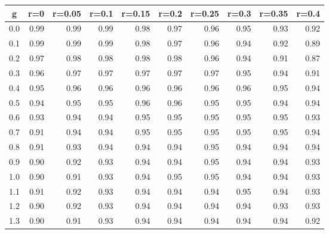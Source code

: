 %
\begin{table}[!tbp]
 \begin{center}
 \begin{tabular}{rrrrrrrrrr}\hline\hline
\multicolumn{1}{c}{g}&\multicolumn{1}{c}{r=0}&\multicolumn{1}{c}{r=0.05}&\multicolumn{1}{c}{r=0.1}&\multicolumn{1}{c}{r=0.15}&\multicolumn{1}{c}{r=0.2}&\multicolumn{1}{c}{r=0.25}&\multicolumn{1}{c}{r=0.3}&\multicolumn{1}{c}{r=0.35}&\multicolumn{1}{c}{r=0.4}\tabularnewline
\hline
0.0&0.99&0.99&0.99&0.98&0.97&0.96&0.95&0.93&0.92\tabularnewline
0.1&0.99&0.99&0.99&0.98&0.97&0.96&0.94&0.92&0.89\tabularnewline
0.2&0.97&0.98&0.98&0.98&0.98&0.96&0.94&0.91&0.87\tabularnewline
0.3&0.96&0.97&0.97&0.97&0.97&0.97&0.95&0.94&0.91\tabularnewline
0.4&0.95&0.96&0.96&0.96&0.96&0.96&0.96&0.95&0.94\tabularnewline
0.5&0.94&0.95&0.95&0.96&0.96&0.95&0.95&0.94&0.94\tabularnewline
0.6&0.93&0.94&0.94&0.95&0.95&0.95&0.95&0.95&0.93\tabularnewline
0.7&0.91&0.94&0.94&0.95&0.95&0.95&0.95&0.95&0.94\tabularnewline
0.8&0.91&0.93&0.94&0.94&0.94&0.95&0.94&0.94&0.94\tabularnewline
0.9&0.90&0.92&0.93&0.94&0.94&0.95&0.94&0.94&0.93\tabularnewline
1.0&0.90&0.91&0.93&0.94&0.95&0.95&0.94&0.94&0.93\tabularnewline
1.1&0.91&0.92&0.93&0.94&0.94&0.94&0.95&0.94&0.93\tabularnewline
1.2&0.90&0.92&0.93&0.94&0.94&0.94&0.94&0.93&0.93\tabularnewline
1.3&0.90&0.91&0.93&0.94&0.94&0.94&0.94&0.94&0.92\tabularnewline
\hline
\end{tabular}

\end{center}

\end{table}

